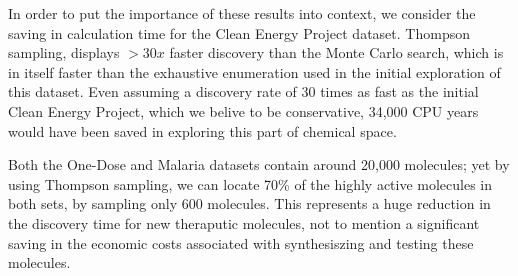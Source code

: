 In order to put the importance of these results into context, we consider the saving in calculation time for the Clean Energy Project dataset. Thompson sampling, displays $>30x$ faster discovery than the Monte Carlo search, which is in itself faster than the exhaustive enumeration used in the initial exploration of this dataset. Even assuming a discovery rate of 30 times as fast as the initial Clean Energy Project, which we belive to be conservative, 34,000 CPU years would have been saved in exploring this part of chemical space.  

Both the One-Dose and Malaria datasets contain around 20,000 molecules; yet by using Thompson sampling, we can locate 70\% of the highly active molecules in both sets, by sampling only 600 molecules. This represents a huge reduction in the discovery time for new theraputic molecules, not to mention a significant saving in the economic costs associated with synthesiszing and testing these molecules.

